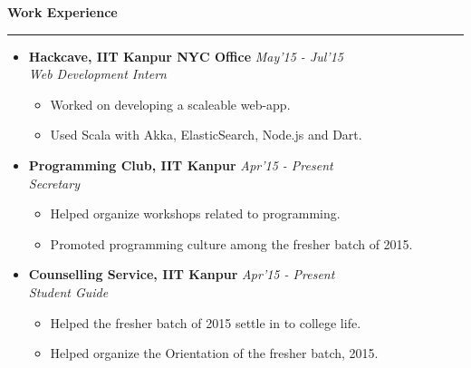 \documentclass[11pt,a4paper]{article}
\begin{document}
\textbf{\Large{Work Experience}}\\
\rule{\textwidth}{01pt}
\begin {itemize}

\item \textbf{\large{Hackcave, IIT Kanpur NYC Office}} \hfill\textit{ May'15 - Jul'15}\\ \emph{\large{Web Development Intern}}
    \begin{itemize}
    \setlength \itemsep{0em}	 
    \item Worked on developing a scaleable web-app.
    \item Used Scala with Akka, ElasticSearch, Node.js and Dart.\\
    \end{itemize}

\item \textbf{\large{Programming Club, IIT Kanpur}} \hfill\textit{ Apr'15 - Present}\\ \emph{\large{Secretary}}
    \begin{itemize}
    \setlength \itemsep{0em}
    \item Helped organize workshops related to programming.
    \item Promoted programming culture among the fresher batch of 2015.\\
    \end{itemize}

\item \textbf{\large{Counselling Service, IIT Kanpur}} \hfill\textit{ Apr'15 - Present}\\ \emph{\large{Student Guide}}
    \begin{itemize}
    \setlength \itemsep{0em}
    \item Helped the fresher batch of 2015 settle in to college life.
    \item Helped organize the Orientation of the fresher batch, 2015.
    \end{itemize}

\end{itemize}

\vspace{5mm}
\end{document}

